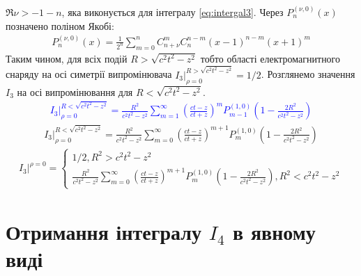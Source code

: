 $ \Re \nu > - 1 - n $, яка виконується для інтегралу \eqref{eq:intergal3}. 
Через $ P_n^{(\nu,0)} (x) $ позначено поліном Якобі:
%
\begin{equation*} \begin{aligned}
P_n^{(\nu,0)} (x) = \frac{1}{2^n} \sum_{m=0}^{n} C_{n+\nu}^{m} C_{n}^{n-m} 
\left( x - 1 \right)^{n-m} \left( x + 1 \right)^m 
\end{aligned} \end{equation*}
%
Таким чином, для всіх подій $ R > \sqrt{c^2 t^2 - z^2} $ тобто області 
електромагнитного снаряду на осі симетрії випромінювача 
$ \left. I_3 \right|_{\rho = 0}^{R > \sqrt{c^2 t^2 - z^2}} = 1/2 $. Розглянемо 
значення $ I_3 $ на осі випромінювання для $ R < \sqrt{c^2 t^2 - z^2} $.
%
\textcolor{blue}{ \begin{equation*} \begin{aligned}
\left. I_3 \right|_{\rho = 0}^{R < \sqrt{c^2 t^2 - z^2}} = 
\frac{R^2}{c^2 t^2 - z^2} \sum_{m=1}^{\infty} 
\left( \frac{ct - z}{ct + z} \right)^m P_{m-1}^{(1,0)} 
\left( 1 - \frac{2R^2}{c^2 t^2 - z^2} \right)
\end{aligned} \end{equation*} }
%
\begin{equation*} \begin{aligned}
\left. I_3 \right|_{\rho = 0}^{R < \sqrt{c^2 t^2 - z^2}} = 
\frac{R^2}{c^2 t^2 - z^2} \sum_{m=0}^{\infty} 
\left( \frac{ct - z}{ct + z} \right)^{m+1} P_{m}^{(1,0)} 
\left( 1 - \frac{2R^2}{c^2 t^2 - z^2} \right)
\end{aligned} \end{equation*}
%
\begin{equation} \begin{aligned} \label{eq:i3onaxis}
\left. I_3 \right|^{\rho = 0} = \begin{cases} 1/2, R^2 > c^2 t^2 - z^2 \\
\frac{R^2}{c^2 t^2 - z^2} \sum_{m=0}^{\infty} 
\left( \frac{ct - z}{ct + z} \right)^{m+1} P_{m}^{(1,0)} 
\left( 1 - \frac{2R^2}{c^2 t^2 - z^2} \right), 
R^2 < c^2 t^2 - z^2 \end{cases}
\end{aligned} \end{equation}

\section{Отримання інтегралу $ I_4 $ в явному виді}

